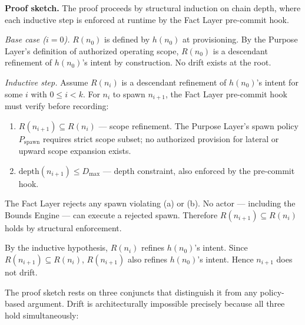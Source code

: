 \medskip
\noindent\textbf{Proof sketch.} The proof proceeds by structural induction on chain depth, where each inductive step is enforced at runtime by the Fact Layer pre-commit hook.

\medskip
\textit{Base case ($i=0$).} $R(n_0)$ is defined by $h(n_0)$ at provisioning. By the Purpose Layer's definition of authorized operating scope, $R(n_0)$ is a descendant refinement of $h(n_0)$'s intent by construction. No drift exists at the root.

\medskip
\textit{Inductive step.} Assume $R(n_i)$ is a descendant refinement of $h(n_0)$'s intent for some $i$ with $0 \leq i < k$. For $n_i$ to spawn $n_{i+1}$, the Fact Layer pre-commit hook must verify before recording:

\begin{enumerate}
    \item[(a)] $R(n_{i+1}) \subseteq R(n_i)$ — scope refinement. The Purpose Layer's spawn policy $P_{\mathrm{spawn}}$ requires strict scope subset; no authorized provision for lateral or upward scope expansion exists.
    \item[(b)] $\mathrm{depth}(n_{i+1}) \leq D_{\mathrm{max}}$ — depth constraint, also enforced by the pre-commit hook.
\end{enumerate}

The Fact Layer rejects any spawn violating (a) or (b). No actor — including the Bounds Engine — can execute a rejected spawn. Therefore $R(n_{i+1}) \subseteq R(n_i)$ holds by structural enforcement.

By the inductive hypothesis, $R(n_i)$ refines $h(n_0)$'s intent. Since $R(n_{i+1}) \subseteq R(n_i)$, $R(n_{i+1})$ also refines $h(n_0)$'s intent. Hence $n_{i+1}$ does not drift.

\medskip
The proof sketch rests on three conjuncts that distinguish it from any policy-based argument. Drift is architecturally impossible precisely because all three hold simultaneously:

